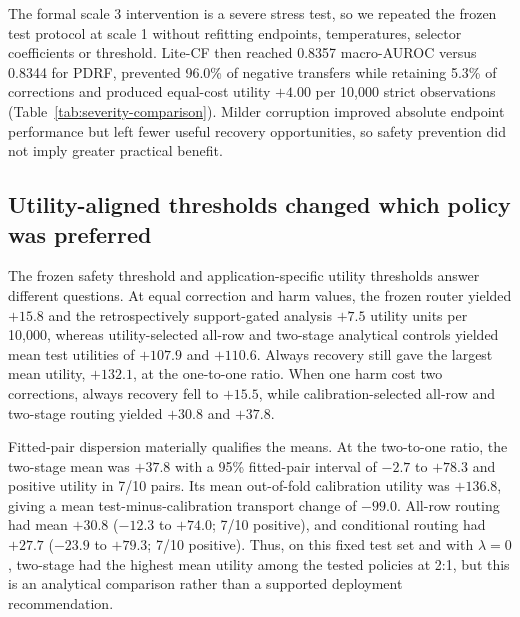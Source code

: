 \documentclass[11pt]{article}
\begin{document}
The formal scale 3 intervention is a severe stress test, so we repeated the frozen test protocol at scale 1 without refitting endpoints, temperatures, selector coefficients or threshold. Lite-CF then reached 0.8357 macro-AUROC versus 0.8344 for PDRF, prevented 96.0\% of negative transfers while retaining 5.3\% of corrections and produced equal-cost utility $+4.00$ per 10,000 strict observations (Table~\ref{tab:severity-comparison}). Milder corruption improved absolute endpoint performance but left fewer useful recovery opportunities, so safety prevention did not imply greater practical benefit.

\begin{table}[ht]
\centering
\caption{\textbf{Mild and formal controlled-corruption severity.} Values are equal-weight means over four fixed mechanisms and 10 fitted model pairs on the strict subset. The scale 1 audit reuses the scale 3-calibrated selector without refitting or retuning. $U/10^4$ uses equal correction and harm values with no pass penalty.}
\label{tab:severity-comparison}
\resizebox{0.95\textwidth}{!}{}
\end{table}

\subsection{Utility-aligned thresholds changed which policy was preferred}

The frozen safety threshold and application-specific utility thresholds answer different questions. At equal correction and harm values, the frozen router yielded $+15.8$ and the retrospectively support-gated analysis $+7.5$ utility units per 10,000, whereas utility-selected all-row and two-stage analytical controls yielded mean test utilities of $+107.9$ and $+110.6$. Always recovery still gave the largest mean utility, $+132.1$, at the one-to-one ratio. When one harm cost two corrections, always recovery fell to $+15.5$, while calibration-selected all-row and two-stage routing yielded $+30.8$ and $+37.8$.

Fitted-pair dispersion materially qualifies the means. At the two-to-one ratio, the two-stage mean was $+37.8$ with a 95\% fitted-pair interval of $-2.7$ to $+78.3$ and positive utility in 7/10 pairs. Its mean out-of-fold calibration utility was $+136.8$, giving a mean test-minus-calibration transport change of $-99.0$. All-row routing had mean $+30.8$ ($-12.3$ to $+74.0$; 7/10 positive), and conditional routing had $+27.7$ ($-23.9$ to $+79.3$; 7/10 positive). Thus, on this fixed test set and with $\lambda=0$, two-stage had the highest mean utility among the tested policies at 2:1, but this is an analytical comparison rather than a supported deployment recommendation.
\end{document}
